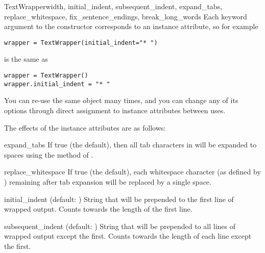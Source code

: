 \begin{classdesc}{TextWrapper}{width, initial_indent, subsequent_indent,
                               expand_tabs, replace_whitespace,
                               fix_sentence_endings, break_long_words}
Each keyword argument to the constructor corresponds to an instance
attribute, so for example
\begin{verbatim}
wrapper = TextWrapper(initial_indent="* ")
\end{verbatim}
is the same as
\begin{verbatim}
wrapper = TextWrapper()
wrapper.initial_indent = "* "
\end{verbatim}

You can re-use the same  object many times, and you
can change any of its options through direct assignment to instance
attributes between uses.
\end{classdesc}


The effects of the instance attributes are as follows:

\begin{memberdesc}{expand_tabs}
If true (the default), then all tab characters in  will be
expanded to spaces using the  method of
.
\end{memberdesc}

\begin{memberdesc}{replace_whitespace}
If true (the default), each whitespace character (as defined by
) remaining after tab expansion will be replaced
by a single space.  
\end{memberdesc}

\begin{memberdesc}{initial_indent}
(default: ) String that will be prepended to the first line
of wrapped output.  Counts towards the length of the first line.
\end{memberdesc}

\begin{memberdesc}{subsequent_indent}
(default: ) String that will be prepended to all lines of
wrapped output except the first.  Counts towards the length of each
line except the first.
\end{memberdesc}

